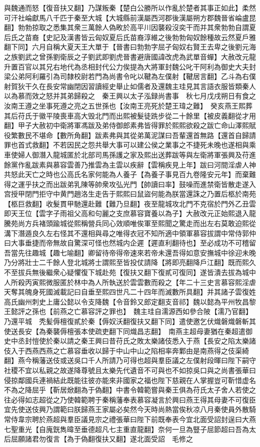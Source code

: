 與魏通而怒【復音扶又翻】乃謀叛秦【楚白公勝所以作亂於楚者其事正如此】柔然可汗社崘獻馬八千匹于秦至大城【大城縣前漢屬西河郡後漢屬朔方郡魏晉省崘盧昆翻】勃勃掠取之悉集其衆三萬餘人偽畋於高平川因襲殺沒奕干而并其衆勃勃自謂夏后氏之苗裔【史記及漢書皆云匈奴夏后氏苗裔淳維之後勃勃匈奴餘種故云然夏戶雅翻下同】六月自稱大夏天王大單于【晉書曰勃勃字屈孑匈奴右賢王去卑之後劉元海之族劉武之曾孫劉衛辰之子劉武即劉虎晉書避唐國諱改虎為武單音蟬】大赦改元龍升置百官以其兄右地代為丞相封代公力俟提為大將軍封魏公叱干阿利為御史大夫封梁公弟阿利羅引為司隸校尉若門為尚書令叱以鞬為左僕射【鞬居言翻】乙斗為右僕射賀狄干久在長安常幽閉因習讀經史舉止如儒者及還魏主珪見其言語衣服皆類秦人以為慕而效之怒并其弟歸殺之　秦王興以太子泓録尚書事　秋七月戊戌朔日有食之　汝南王遵之坐事死遵之亮之五世孫也【汝南王亮死於楚王瑋之難】　癸亥燕王熙葬其后苻氏于徽平陵喪車高大毁北門而出熙被髮徒跣步從二十餘里【被皮義翻從才用翻】甲子大赦初中衛將軍馮跋及弟侍御郎素弗皆得罪於熙熙欲殺之跋亡命山澤熙賦役繁數民不堪命【數所角翻】跋素弗與其從弟萬泥謀曰吾輩還首無路【還首自歸請罪也首式救翻】不若因民之怨共舉大事可以建公侯之業事之不捷死未晚也遂相與乘車使婦人御潛入龍城匿於北部司馬孫護之家及熙出送葬跋等與左衛將軍張興及苻進餘黨作亂跋素與慕容雲善乃推雲為主雲以疾辭【雲稱疾見上年】跋曰河間淫虐人神共怒此天亡之時也公高氏名家何能為人養子【為養子事見百九卷隆安元年】而棄難得之運乎扶之而出跋弟乳陳等帥衆攻弘光門【帥讀曰率】鼓噪而進禁衛皆散走遂入宫授甲閉門拒守中黄門趙洛生走告于熙熙曰鼠盜何能為朕當還誅之乃置后柩於南苑【柩巨救翻】收髮貫甲馳還赴難【難乃旦翻】夜至龍城攻北門不克宿於門外乙丑雲即天王位【雲字子雨祖父高和句麗之支庶慕容寶養以為子】大赦改元正始熙退入龍騰苑尚方兵褚頭踰城從熙稱營兵同心效順唯俟軍至熙聞之驚走而出左右莫敢迫熙從溝下潛遁良久左右怪其不還相與尋之唯得衣冠不知所適中領軍慕容拔謂中常侍郭仲曰大事垂捷而帝無故自驚深可怪也然城内企遲【遲直利翻待也】至必成功不可稽留吾當先往趣城【趣七喻翻】卿留待帝得帝速來若帝未還吾得如意安撫城中徐迎未晚乃分將壯士二千餘人登北城將士謂熙至皆投仗請降【將即亮翻降戶江翻】既而熙久不至拔兵無後繼衆心疑懼復下城赴苑【復扶又翻下復貳可復同】遂皆潰去拔為城中人所殺丙寅熙微服匿於林中為人所執送於雲雲數而殺之【年二十三史言慕容熙淫虐天奪其魄身死國滅載記曰自垂至熙四世凡二十四年而滅數所具翻】并其諸子雲復姓高氏幽州刺史上庸公懿以令支降魏【令音鈴又郎定翻支音祁】魏以懿為平州牧昌黎王懿評之孫也【前燕之亡慕容評之罪也】　魏主珪自濡源西如參合陂【濡乃官翻】乃還平城　秃髪傉檀復貳於秦【傉奴沃翻復扶又翻下同】遣使邀乞伏熾磐熾磐斬其使送長安【為秦襲傉檀張本使疏吏翻下同熾昌志翻】　南燕主超母妻猶在秦超遣御史中丞封愷使於秦以請之秦王興曰昔苻氏之敗太樂諸伎悉入于燕【長安之陷太樂諸伎入于西燕西燕之亡慕容垂收以歸于中山中山之陷相率奔鄴由是南燕得之伎渠綺翻】燕今稱藩送伎或送吳口千人所請乃可得也超與羣臣議之左僕射段暉曰陛下嗣守社稷不宜以私親之故遂降尊號且太樂先代遺音不可與也不如掠吳口與之尚書張華曰侵掠鄰國兵連禍結此既能往彼亦能來非國家之福也陛下慈親在人掌握豈可靳惜虚名不為之降屈乎【靳居焮翻為于偽翻】中書令韓範嘗與秦王俱為苻氏太子舍人若使之往必得如志超從之乃使韓範聘于秦稱藩奉表慕容凝言於興曰燕王得其母妻不可復臣宜先使送伎興乃謂範曰朕歸燕王家屬必矣然今天時尚熱當俟秋凉八月秦使員外散騎常侍韋宗聘於燕超與羣臣議見宗之禮張華曰陛下前既奉表今宜北面受詔封逞曰大燕七聖重光【自廆皝雋暐至垂德超凡七主重直龍翻】奈何一旦為豎子屈節超曰吾為太后屈願諸君勿復言【為于偽翻復扶又翻】遂北面受詔　毛修之